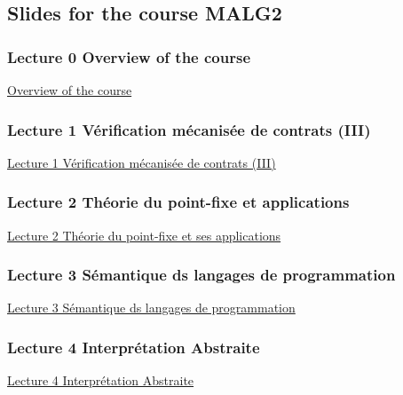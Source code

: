 \documentclass[ 12pt]{article}
\begin{document}
\subsection{Slides for the course MALG2}
\label{sec:slides}


\subsubsection{Lecture 0  {Overview of the course }}
  
  \href{http://mery54.github.io/teaching/movex/lecturesnotes/malglecture0.pdf}{Overview of the course }


   \subsubsection{Lecture 1 {Vérification  mécanisée de contrats} (III)}

   \href{http://mery54.github.io/teaching/movex/lecturesnotes/malglecture1.pdf}{Lecture
     1  Vérification  mécanisée de contrats (III)}


   
   \subsubsection{Lecture 2 {Théorie du point-fixe et applications}}

   \href{http://mery54.github.io/teaching/movex/lecturesnotes/malglecture2.pdf}{Lecture
     2  Théorie du point-fixe et ses applications}
   

   
   \subsubsection{Lecture 3 {Sémantique ds langages de programmation}}

   \href{http://mery54.github.io/teaching/movex/lecturesnotes/malglecture3.pdf}{Lecture
     3 Sémantique ds langages de programmation}
   

   \subsubsection{Lecture 4 {Interprétation Abstraite}}

   \href{http://mery54.github.io/teaching/movex/lecturesnotes/malglecture4.pdf}{Lecture
     4 Interprétation Abstraite}
   

  
  
\end{document}
